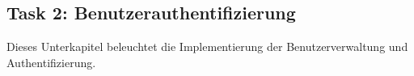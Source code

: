 \subsection{Task 2: Benutzerauthentifizierung}
\label{subsec:results_t2}

Dieses Unterkapitel beleuchtet die Implementierung der Benutzerverwaltung und Authentifizierung.

%
